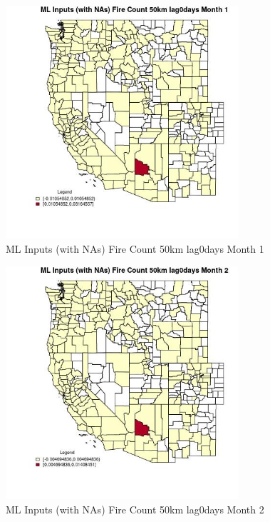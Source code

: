 \begin{figure} 
\centering  
\includegraphics[width=0.77\textwidth]{Code_Outputs/Report_ML_input_PM25_Step4_part_e_de_duplicated_aves_compiled_2019-05-21wNAs_CountyFire_Count_50km_lag0daysmedianMonth1.jpg} 
\caption{\label{fig:Report_ML_input_PM25_Step4_part_e_de_duplicated_aves_compiled_2019-05-21wNAsCountyFire_Count_50km_lag0daysmedianMonth1}ML Inputs (with NAs) Fire Count 50km lag0days Month 1} 
\end{figure} 
 

\begin{figure} 
\centering  
\includegraphics[width=0.77\textwidth]{Code_Outputs/Report_ML_input_PM25_Step4_part_e_de_duplicated_aves_compiled_2019-05-21wNAs_CountyFire_Count_50km_lag0daysmedianMonth2.jpg} 
\caption{\label{fig:Report_ML_input_PM25_Step4_part_e_de_duplicated_aves_compiled_2019-05-21wNAsCountyFire_Count_50km_lag0daysmedianMonth2}ML Inputs (with NAs) Fire Count 50km lag0days Month 2} 
\end{figure} 
 

